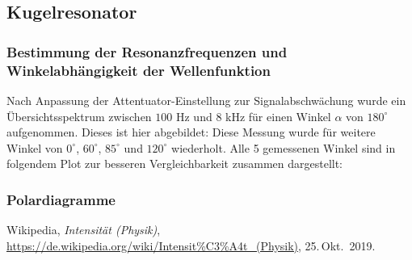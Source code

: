 \documentclass[german,  %
parskip=full,  %
]{scrartcl}
\begin{document}
\subsection{Kugelresonator}
\subsubsection{Bestimmung der Resonanzfrequenzen und Winkelabhängigkeit der Wellenfunktion}
Nach Anpassung der Attentuator-Einstellung zur Signalabschwächung wurde ein Übersichtsspektrum zwischen $100$ Hz und $8$ kHz für einen Winkel $\alpha$ von $180^{\circ}$ aufgenommen. Dieses ist hier abgebildet:
Diese Messung wurde für weitere Winkel von  $0^{\circ}$, $60^{\circ}$, $85^{\circ}$ und $120^{\circ}$ wiederholt. Alle 5 gemessenen Winkel sind in folgendem Plot zur besseren Vergleichbarkeit zusammen dargestellt:

\subsubsection{Polardiagramme}








    \begin{thebibliography}{9}
    Wikipedia,
    \emph{Intensität (Physik)},
    \url{https://de.wikipedia.org/wiki/Intensit%C3%A4t_(Physik)},
    25.\,Okt.~2019.
    \end{thebibliography}
\end{document}
